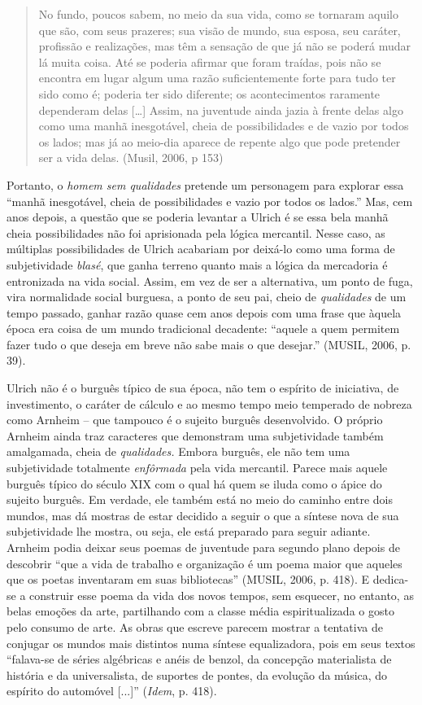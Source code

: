 \begin{quote}
No fundo, poucos sabem, no meio da sua vida, como se tornaram aquilo que
são, com seus prazeres; sua visão de mundo, sua esposa, seu caráter,
profissão e realizações, mas têm a sensação de que já não se poderá
mudar lá muita coisa. Até se poderia afirmar que foram traídas, pois não
se encontra em lugar algum uma razão suficientemente forte para tudo ter
sido como é; poderia ter sido diferente; os acontecimentos raramente
dependeram delas {[}\ldots{}{]} Assim, na juventude ainda jazia à frente
delas algo como uma manhã inesgotável, cheia de possibilidades e de
vazio por todos os lados; mas já ao meio-dia aparece de repente algo que
pode pretender ser a vida delas. (Musil, 2006, p 153)
\end{quote}

Portanto, o \emph{homem sem qualidades} pretende um personagem para
explorar essa ``manhã inesgotável, cheia de possibilidades e vazio por
todos os lados.'' Mas, cem anos depois, a questão que se poderia
levantar a Ulrich é se essa bela manhã cheia possibilidades não foi
aprisionada pela lógica mercantil. Nesse caso, as múltiplas
possibilidades de Ulrich acabariam por deixá-lo como uma forma de
subjetividade \emph{blasé}, que ganha terreno quanto mais a lógica da
mercadoria é entronizada na vida social. Assim, em vez de ser a
alternativa, um ponto de fuga, vira normalidade social burguesa, a ponto
de seu pai, cheio de \emph{qualidades} de um tempo passado, ganhar razão
quase cem anos depois com uma frase que àquela época era coisa de um
mundo tradicional decadente: ``aquele a quem permitem fazer tudo o que
deseja em breve não sabe mais o que desejar.'' (MUSIL, 2006, p. 39).

Ulrich não é o burguês típico de sua época, não tem o espírito de
iniciativa, de investimento, o caráter de cálculo e ao mesmo tempo meio
temperado de nobreza como Arnheim -- que tampouco é o sujeito burguês
desenvolvido. O próprio Arnheim ainda traz caracteres que demonstram uma
subjetividade também amalgamada, cheia de \emph{qualidades.} Embora
burguês, ele não tem uma subjetividade totalmente \emph{enfôrmada} pela
vida mercantil. Parece mais aquele burguês típico do século XIX com o
qual há quem se iluda como o ápice do sujeito burguês. Em verdade, ele
também está no meio do caminho entre dois mundos, mas dá mostras de
estar decidido a seguir o que a síntese nova de sua subjetividade lhe
mostra, ou seja, ele está preparado para seguir adiante. Arnheim podia
deixar seus poemas de juventude para segundo plano depois de descobrir
``que a vida de trabalho e organização é um poema maior que aqueles que
os poetas inventaram em suas bibliotecas'' (MUSIL, 2006, p. 418). E
dedica-se a construir esse poema da vida dos novos tempos, sem esquecer,
no entanto, as belas emoções da arte, partilhando com a classe média
espiritualizada o gosto pelo consumo de arte. As obras que escreve
parecem mostrar a tentativa de conjugar os mundos mais distintos numa
síntese equalizadora, pois em seus textos ``falava-se de séries
algébricas e anéis de benzol, da concepção materialista de história e da
universalista, de suportes de pontes, da evolução da música, do espírito
do automóvel {[}...{]}'' (\emph{Idem}, p. 418).


